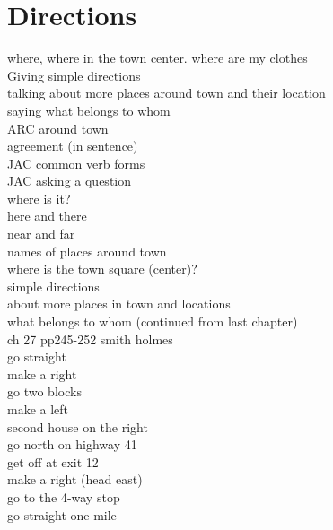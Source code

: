 \chapter{Directions}
where, where in the town center. where are my clothes\\
Giving simple directions\\
talking about more places around town and their location\\
saying what belongs to whom\\
ARC around town\\
agreement (in sentence)\\
JAC common verb forms\\
JAC asking a question\\
where is it?\\
here and there\\
near and far\\
names of places around town\\
where is the town square (center)?\\
simple directions\\
about more places in town and locations\\
what belongs to whom (continued from last chapter)\\
ch 27 pp245-252 smith holmes\\
go straight\\
make a right\\
go two blocks\\
make a left\\
second house on the right\\
go north on highway 41\\
get off at exit 12\\
make a right (head east)\\
go to the 4-way stop\\
go straight one mile\\
\newpage
